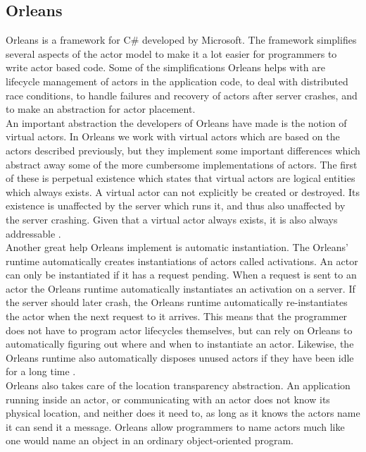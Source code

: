\subsection{Orleans}
Orleans is a framework for C\# developed by Microsoft. The framework simplifies several aspects of the actor model to make it a lot easier for programmers to write actor based code. Some of the simplifications Orleans helps with are lifecycle management of actors in the application code, to deal with distributed race conditions, to handle failures and recovery of actors after server crashes, and to make an abstraction for actor placement.\\
An important abstraction the developers of Orleans have made is the notion of virtual actors. In Orleans we work with virtual actors which are based on the actors described previously, but they implement some important differences which abstract away some of the more cumbersome implementations of actors. The first of these is perpetual existence which states that virtual actors are logical entities which always exists. A virtual actor can not explicitly be created or destroyed. Its existence is unaffected by the server which runs it, and thus also unaffected by the server crashing. Given that a virtual actor always exists, it is also always addressable \cite{OrleansPaper}.\\
Another great help Orleans implement is automatic instantiation. The Orleans' runtime automatically creates instantiations of actors called activations. An actor can only be instantiated if it has a request pending. When a request is sent to an actor the Orleans runtime automatically instantiates an activation on a server. If the server should later crash, the Orleans runtime automatically re-instantiates the actor when the next request to it arrives. This means that the programmer does not have to program actor lifecycles themselves, but can rely on Orleans to automatically figuring out where and when to instantiate an actor. Likewise, the Orleans runtime also automatically disposes unused actors if they have been idle for a long time \cite{OrleansPaper}.\\
Orleans also takes care of the location transparency abstraction. An application running inside an actor, or communicating with an actor does not know its physical location, and neither does it need to, as long as it knows the actors name it can send it a message. Orleans allow programmers to name actors much like one would name an object in an ordinary object-oriented program.\\
